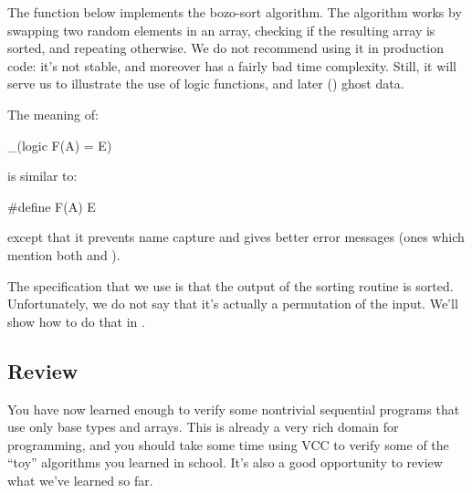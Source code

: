 {{%
The function below implements the bozo-sort algorithm.
The algorithm works by swapping two random elements in an array, checking if the resulting array
is sorted, and repeating otherwise.
We do not recommend using it in production code:
it's not stable, and moreover has a fairly bad time complexity.
Still, it will serve us to illustrate the use of logic functions, and later () ghost data.


\noindent
The meaning of:
\begin{VCC}
_(logic F(A) = E)
\end{VCC}
is similar to:
\begin{VCC}
#define F(A) E
\end{VCC}
except that it prevents
name capture and gives better error messages (\ie ones which mention both  and ).

The specification that we use is that the output of the sorting routine is sorted.
Unfortunately, we do not say that it's actually a permutation of the input.
We'll show how to do that in .

\subsection{Review}
%

You have now learned enough to verify some nontrivial sequential
programs that use only base types and arrays.  This is already a very
rich domain for programming, and you should take some time using VCC
to verify some of the ``toy'' algorithms you learned in school. It's
also a good opportunity to review what we've learned so far.

}}
